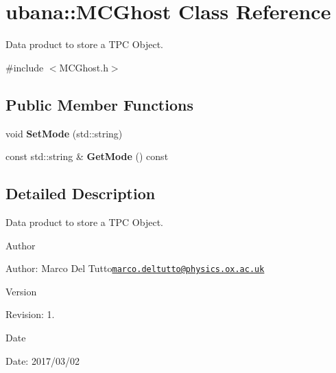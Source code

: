 \hypertarget{classubana_1_1MCGhost}{\section{ubana\-:\-:M\-C\-Ghost Class Reference}
\label{classubana_1_1MCGhost}
}


Data product to store a T\-P\-C Object.  




{\ttfamily \#include $<$M\-C\-Ghost.\-h$>$}

\subsection*{Public Member Functions}
\begin{DoxyCompactItemize}
\item 
\hypertarget{classubana_1_1MCGhost_ab78e269293fee8be5b8c6cca432d6d69}{void {\bfseries Set\-Mode} (std\-::string)}\label{classubana_1_1MCGhost_ab78e269293fee8be5b8c6cca432d6d69}

\item 
\hypertarget{classubana_1_1MCGhost_ae6b7f0a7adbf65eb38deb80b3f207f0b}{const std\-::string \& {\bfseries Get\-Mode} () const }\label{classubana_1_1MCGhost_ae6b7f0a7adbf65eb38deb80b3f207f0b}

\end{DoxyCompactItemize}


\subsection{Detailed Description}
Data product to store a T\-P\-C Object. 

\begin{DoxyAuthor}{Author}

\end{DoxyAuthor}
\begin{DoxyParagraph}{Author\-:}
Marco Del Tutto\href{mailto:marco.deltutto@physics.ox.ac.uk}{\tt marco.\-deltutto@physics.\-ox.\-ac.\-uk} 
\end{DoxyParagraph}


\begin{DoxyVersion}{Version}

\end{DoxyVersion}
\begin{DoxyParagraph}{Revision\-:}
1. 
\end{DoxyParagraph}


\begin{DoxyDate}{Date}

\end{DoxyDate}
\begin{DoxyParagraph}{Date\-:}
2017/03/02 
\end{DoxyParagraph}


